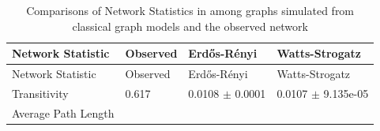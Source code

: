 \documentclass[12pt,twoside]{amherstthesis}
\begin{document}
  \begin{longtable}[]{@{}llll@{}}
  \caption{Comparisons of Network Statistics in among graphs simulated
  from classical graph models and the observed network
  \label{tab:erwsdescstats}}\tabularnewline
  \toprule
  \begin{minipage}[b]{0.29\columnwidth}\raggedright\strut
  Network Statistic\strut
  \end{minipage} & \begin{minipage}[b]{0.11\columnwidth}\raggedright\strut
  Observed\strut
  \end{minipage} & \begin{minipage}[b]{0.25\columnwidth}\raggedright\strut
  Erdős-Rényi\strut
  \end{minipage} & \begin{minipage}[b]{0.25\columnwidth}\raggedright\strut
  Watts-Strogatz\strut
  \end{minipage}\tabularnewline
  \midrule
  \endfirsthead
  \toprule
  \begin{minipage}[b]{0.29\columnwidth}\raggedright\strut
  Network Statistic\strut
  \end{minipage} & \begin{minipage}[b]{0.11\columnwidth}\raggedright\strut
  Observed\strut
  \end{minipage} & \begin{minipage}[b]{0.25\columnwidth}\raggedright\strut
  Erdős-Rényi\strut
  \end{minipage} & \begin{minipage}[b]{0.25\columnwidth}\raggedright\strut
  Watts-Strogatz\strut
  \end{minipage}\tabularnewline
  \midrule
  \endhead
  \begin{minipage}[t]{0.29\columnwidth}\raggedright\strut
  Transitivity\strut
  \end{minipage} & \begin{minipage}[t]{0.11\columnwidth}\raggedright\strut
  0.617\strut
  \end{minipage} & \begin{minipage}[t]{0.25\columnwidth}\raggedright\strut
  0.0108 \(\pm\) 0.0001\strut
  \end{minipage} & \begin{minipage}[t]{0.25\columnwidth}\raggedright\strut
  0.0107 \(\pm\) 9.135e-05\strut
  \end{minipage}\tabularnewline
  \begin{minipage}[t]{0.29\columnwidth}\raggedright\strut
  Average Path Length\strut

\end{minipage}
\end{longtable}
\end{document}
